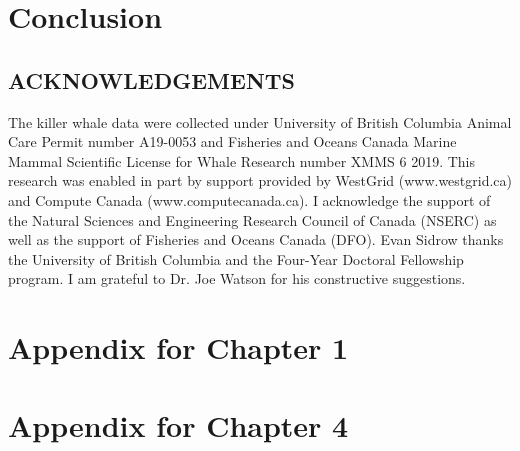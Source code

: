 \documentclass{report}
\begin{document}

\chapter{Conclusion}



\section*{ACKNOWLEDGEMENTS}
The killer whale data were collected under University of British Columbia Animal Care Permit number A19-0053 and Fisheries and Oceans Canada Marine Mammal Scientific License for Whale Research number XMMS 6 2019.
This research was enabled in part by support provided by WestGrid (www.westgrid.ca) and Compute Canada (www.computecanada.ca).
I acknowledge the support of the Natural Sciences and Engineering Research Council of Canada (NSERC) as well as the support of Fisheries and Oceans Canada (DFO). 
Evan Sidrow thanks the University of British Columbia and the Four-Year Doctoral Fellowship program.
I am grateful to Dr. Joe Watson for his constructive suggestions.
%
\newpage

%

\begin{appendix}

\chapter{Appendix for Chapter 1}


%

%

\chapter{Appendix for Chapter 4}


\end{appendix}

%
\end{document}
